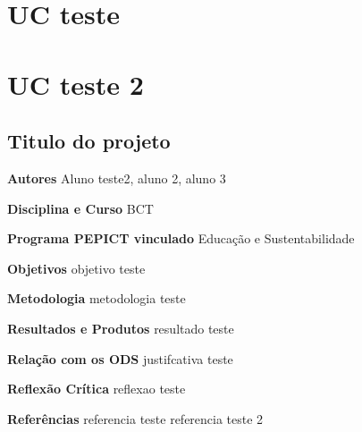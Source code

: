 \documentclass[12pt,openright,oneside,a4paper]{report}
\begin{document}
\vspace{0.7cm}
\chapter{UC teste}

\chapter{UC teste 2}

\section{Titulo do projeto}
\noindent
\textbf{Autores}
Aluno teste2, aluno 2, aluno 3

\vspace{0.7cm}
\noindent
\textbf{Disciplina e Curso}
BCT

\vspace{0.7cm}
\noindent
\textbf{Programa PEPICT vinculado}
Educação e Sustentabilidade

\vspace{0.7cm}
\noindent
\textbf{Objetivos}
objetivo teste

\vspace{0.7cm}
\noindent
\textbf{Metodologia}
metodologia teste

\vspace{0.7cm}
\noindent
\textbf{Resultados e Produtos}
resultado teste

\vspace{0.7cm}
\noindent
\textbf{Relação com os ODS}
justifcativa teste

\vspace{0.7cm}
\noindent
\textbf{Reflexão Crítica}
reflexao teste

\vspace{0.7cm}
\noindent
\textbf{Referências}
referencia teste
referencia teste 2

\vspace{0.7cm}
\end{document}
